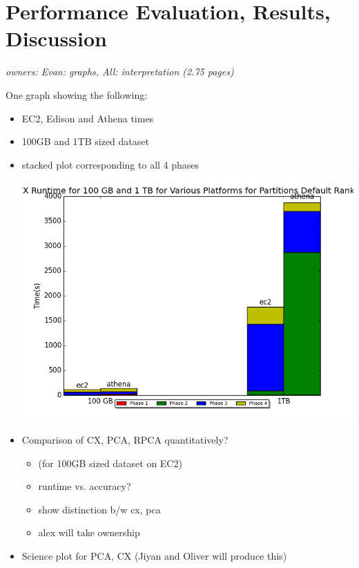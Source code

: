 \usepackage{graphicx}
\graphicspath{ {images/} }
\section{Performance Evaluation, Results, Discussion}

\textit{owners: Evan: graphs, All: interpretation (2.75 pages)}

  \item One graph showing the following:
  \begin{itemize}
    \item EC2, Edison and Athena times
    \item 100GB and 1TB sized dataset
    \item stacked plot corresponding to all 4 phases
    \includegraphics{dataset_scale_graphs}

 \item Comparison of CX, PCA, RPCA quantitatively? 
  \begin{itemize}
    \item (for 100GB sized dataset on EC2)
    \item runtime vs. accuracy?
    \item show distinction b/w cx, pca
    \item alex will take ownership
  \end{itemize}

 \item Science plot for PCA, CX (Jiyan and Oliver will produce this)
\end{itemize}
